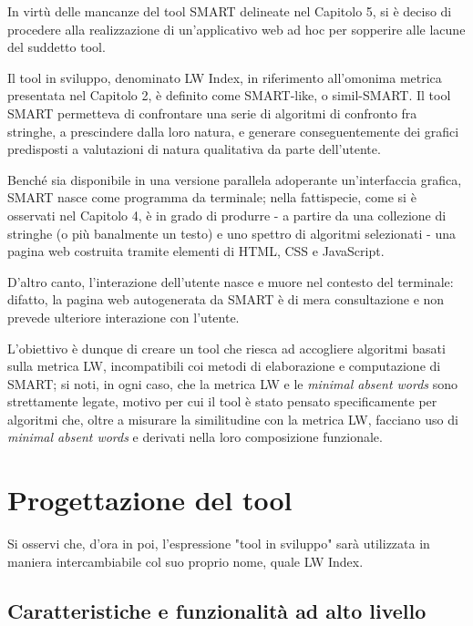 In virtù delle mancanze del tool SMART delineate nel Capitolo 5, si è deciso di procedere alla realizzazione di un'applicativo web ad hoc per sopperire alle lacune del suddetto tool.

\vspace{3mm}

Il tool in sviluppo, denominato LW Index, in riferimento all'omonima metrica presentata nel Capitolo 2, è definito come SMART-like, o simil-SMART. Il tool SMART permetteva di confrontare una serie di algoritmi di confronto fra stringhe, a prescindere dalla loro natura, e generare conseguentemente dei grafici predisposti a valutazioni di natura qualitativa da parte dell'utente.

Benché sia disponibile in una versione parallela adoperante un'interfaccia grafica, SMART nasce come programma da terminale; nella fattispecie, come si è osservati nel Capitolo 4, è in grado di produrre - a partire da una collezione di stringhe (o più banalmente un testo) e uno spettro di algoritmi selezionati - una pagina web costruita tramite elementi di HTML, CSS e JavaScript. 

D'altro canto, l'interazione dell'utente nasce e muore nel contesto del terminale: difatto, la pagina web autogenerata da SMART è di mera consultazione e non prevede ulteriore interazione con l'utente.

\vspace{3mm}

L'obiettivo è dunque di creare un tool che riesca ad accogliere algoritmi basati sulla metrica LW, incompatibili coi metodi di elaborazione e computazione di SMART; si noti, in ogni caso, che la metrica LW e le \textit{minimal absent words} sono strettamente legate, motivo per cui il tool è stato pensato specificamente per algoritmi che, oltre a misurare la similitudine con la metrica LW, facciano uso di \textit{minimal absent words} e derivati nella loro composizione funzionale.

\section{Progettazione del tool}

    Si osservi che, d'ora in poi, l'espressione "tool in sviluppo" sarà utilizzata in maniera intercambiabile col suo proprio nome, quale LW Index. 

    \subsection{Caratteristiche e funzionalità ad alto livello}

